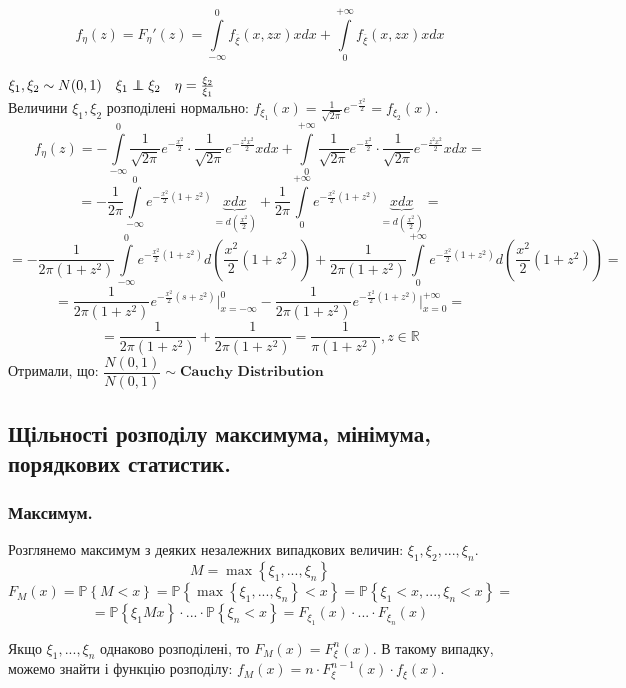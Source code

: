 $$
f_{\eta}(z) = F_{\eta}'(z) =  \int\limits_{-\infty}^{ 0}{ f_{\overline{\xi}}(x,zx)x dx} +  \int\limits_{0}^{ +\infty}{f_{\overline{\xi}}(x, zx) x dx}
$$
\begin{example}
    $\xi_1, \xi_2 \sim N(0,1) \quad \xi_1 \independent \xi_2 \quad \eta = \frac{\xi_2}{\xi_1} $
\\ Величини $\xi_1, \xi_2$ розподілені нормально: $
f_{\xi_1} (x) = \frac{1}{\sqrt{2 \pi}} e^{ - \frac{x^2}{2} }  = f_{\xi_2 } (x).
$
$$
f_{\eta} (z) = -  \int\limits_{-\infty}^{ 0}{\frac{1}{\sqrt{2 \pi}} e^{ - \frac{x^2}{2} } \cdot \frac{1}{\sqrt{2 \pi}} e^{ - \frac{z^2x^2}{2} } } x dx + \int\limits_{0}^{ +\infty}{\frac{1}{\sqrt{2 \pi}} e^{ - \frac{x^2}{2} } \cdot \frac{1}{\sqrt{2 \pi}} e^{ - \frac{z^2x^2}{2} } } x dx  =
$$
$$
= - \frac{1}{2\pi}  \int\limits_{-\infty}^{0}{ e^{ -\frac{x^2}{2}(1+z^2) }} \underbrace{xdx}_{= d \left( \frac{x^2}{2}  \right)}  + \frac{1}{2\pi}  \int\limits_{0}^{+ \infty}{ e^{ -\frac{x^2}{2}(1+z^2) }} \underbrace{xdx}_{= d \left( \frac{x^2}{2}  \right)} =
$$
$$
= - \frac{1 }{2 \pi ( 1 + z^2)}  \int\limits_{-\infty}^{0}{ e^{- \frac{x^2}{2}(1+z^2) } d \left( \frac{x^2}{2}(1+z^2) \right) }  + \frac{1 }{2 \pi ( 1 + z^2)}  \int\limits_{0}^{+ \infty}{ e^{- \frac{x^2}{2}(1+z^2) } d \left( \frac{x^2}{2}(1+z^2) \right) } =
$$
$$
= \frac{1 }{2 \pi ( 1 + z^2)}   e^{- \frac{x^2}{2}(s+z^2) } \Bigg|_{x = -\infty}^{0}  - \frac{1 }{2 \pi ( 1 + z^2)}   e^{- \frac{x^2}{2}(1+z^2) } \Bigg|_{x = 0}^{+\infty} =
$$
$$
 =\frac{1}{2\pi (1+ z^2)} +  \frac{1}{2\pi (1+ z^2)} = \frac{1}{\pi (1+ z^2)} , z \in \mathbb{R}
$$
Отримали, що: $ \dfrac{N(0,1)}{N(0,1)} \sim \textbf{Cauchy Distribution} $
\end{example}

\subsection{Щільності розподілу максимума, мінімума, порядкових статистик.}
\subsubsection{Максимум.}
Розглянемо максимум з деяких незалежних випадкових величин: $ \xi_1 , \xi_2, ... , \xi_n$.
$$M = \max \left\lbrace \xi_1, ..., \xi_n \right\rbrace $$
$$
F_M (x) =  \mathbb{P} \left\lbrace M < x \right\rbrace = \mathbb{P} \left\lbrace \max \left\lbrace \xi_1, ... , \xi_n \right\rbrace < x  \right\rbrace  = \mathbb{P} \left\lbrace \xi_1 < x, ... , \xi_n < x \right\rbrace =
$$
$$
= \mathbb{P} \left\lbrace \xi_1 M x \right\rbrace \cdot ... \cdot \mathbb{P} \left\lbrace  \xi_n < x \right\rbrace = F_{\xi_1} (x ) \cdot ... \cdot F_{\xi_n} (x)
$$
\begin{center}
\end{center}
Якщо $\xi_1 , ..., \xi_n$ однаково розподілені, то $ F_M (x) = F^n_{\xi} (x)$. В такому випадку, можемо знайти і функцію розподілу: $ f_M (x) = n \cdot F_{\xi}^{n-1} (x) \cdot f_{\xi }(x)$.
